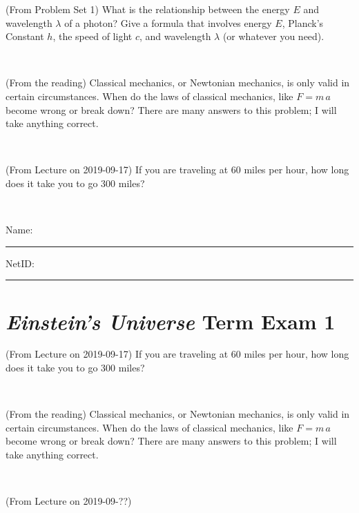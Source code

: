 \documentclass[12pt, letterpaper]{article}
\begin{document}
\begin{problem} (From Problem Set 1)
What is the relationship between the energy $E$ and wavelength
$\lambda$ of a photon? Give a formula that involves energy $E$,
Planck's Constant $h$, the speed of light $c$, and wavelength
$\lambda$ (or whatever you need).
\end{problem}

\vfill ~

\begin{problem} (From the reading)
Classical mechanics, or Newtonian mechanics, is only valid in certain
circumstances. When do the laws of classical mechanics, like $F =
m\,a$ become wrong or break down? There are many answers to this
problem; I will take anything correct.
\end{problem}


\vfill ~

\begin{problem} (From Lecture on 2019-09-17)
If you are traveling at 60 miles per hour, how long does
it take you to go 300 miles?
\end{problem}


\vfill ~


\cleardoublepage



\noindent
Name: \rule[-1ex]{0.60\textwidth}{0.1pt}
NetID: \rule[-1ex]{0.20\textwidth}{0.1pt}

\section*{\textsl{Einstein's Universe} Term Exam 1}
\setcounter{problem}{1}


\begin{problem} (From Lecture on 2019-09-17)
If you are traveling at 60 miles per hour, how long does
it take you to go 300 miles?
\end{problem}


\vfill ~

\begin{problem} (From the reading)
Classical mechanics, or Newtonian mechanics, is only valid in certain
circumstances. When do the laws of classical mechanics, like $F =
m\,a$ become wrong or break down? There are many answers to this
problem; I will take anything correct.
\end{problem}


\vfill ~

\begin{problem} (From Lecture on 2019-09-??)
\end{problem}
\end{document}
